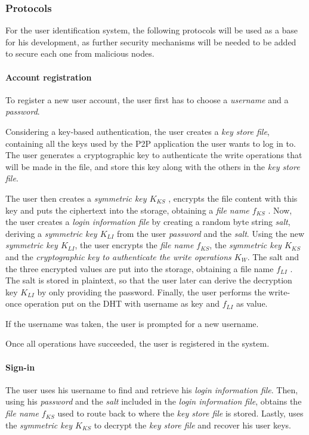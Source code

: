 \documentclass[12pt,spanish]{article}
\begin{document}
\subsubsection{Protocols}
For the user identification system, the following protocols will be used as a
base for his development, as further security mechanisms will be needed to be
added to secure each one from malicious nodes.

\paragraph{Account registration}

To register a new user account, the user first
has to choose a \textit{username} and a \textit{password}.

Considering a key-based authentication, the user creates a \textit{key store file}, containing all the
keys used by the P2P application the user wants to log in to.
The user generates a cryptographic key to authenticate the write operations
that will be made in the file, and store this key along with the others in the
\textit{key store file}.


The user then creates a \textit{symmetric key $K_{KS}$} ,
encrypts the file content with this key and puts the ciphertext
into the storage, obtaining a \textit{file name $f_{KS}$} . Now, the user
creates a \textit{login information file} by creating a random
byte string \textit{salt}, deriving a \textit{symmetric key $K_{LI}$} from the user
\textit{password} and the \textit{salt}.
Using the new \textit{ symmetric key $K_{LI}$}, the user encrypts the
\textit{file name $f_{KS}$},
the \textit{symmetric key $K_{KS}$} and the \textit{cryptographic key to
authenticate the write operations $K_W$}.
 The salt and the three encrypted values are put
into the storage, obtaining a file name $f_{LI}$ . The salt is stored
in plaintext, so that the user later can derive the decryption
key $K_{LI}$ by only providing the password. Finally, the user
performs the write-once operation put on the DHT with
username as key and $f_{LI}$ as value.

If the username was taken,
the user is prompted for a new username.

Once all operations
have succeeded, the user is registered in the system.



\paragraph{Sign-in}
The user uses his username to find and retrieve his \textit{login information
file}. Then, using his \textit{password} and the \textit{salt} included in the
\textit{login information file}, obtains the \textit{file name $f_{KS}$} used to
route back to where the \textit{key store file} is stored.  Lastly, uses the
\textit{symmetric key $K_{KS}$} to decrypt the \textit{key store file} and recover
his user keys.
\end{document}

